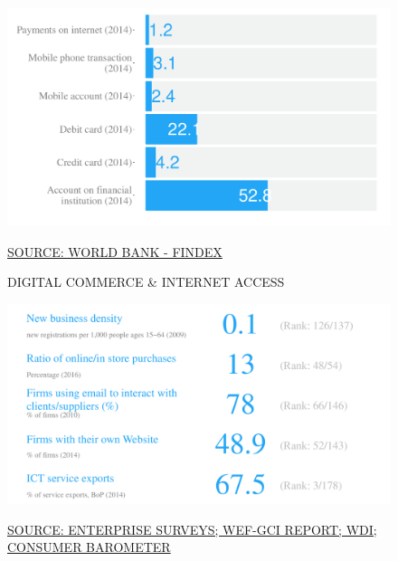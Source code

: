 \documentclass{article}\usepackage[]{graphicx}\usepackage[]{color}
\makeatletter
\def\maxwidth{ %
  \ifdim\Gin@nat@width>\linewidth
    \linewidth
  \else
    \Gin@nat@width
  \fi
}
\makeatother
\begin{document}
\begin{figure}
\begin{minipage}[c]{0.95\textwidth}
\begin{minipage}[b]{0.95\textwidth}
\begin{minipage}[c]{0.48\textwidth}
{\centering \includegraphics[width=\maxwidth]{figure/bar_chart_Markets-1} 

}



      \vspace*{-0.1cm} 
      \scriptsize{\href{NA}{\textcolor[HTML]{22A6F5}{SOURCE: WORLD BANK - FINDEX}}}
    \end{minipage}
    \begin{minipage}[c]{0.48\textwidth} %
      \small{\textcolor[HTML]{818181}{DIGITAL COMMERCE \& INTERNET ACCESS}}
      \vspace{1ex}


{\centering \includegraphics[width=\maxwidth]{figure/number_chart_Markets-1} 

}



      \vspace{2ex}
      \hspace{4ex}\scriptsize{\href{NA}{\textcolor[HTML]{22A6F5}{SOURCE: ENTERPRISE SURVEYS; WEF-GCI REPORT; WDI; CONSUMER BAROMETER}}}
    \end{minipage}
  \end{minipage}  



\end{minipage}
\end{figure}
\end{document}
